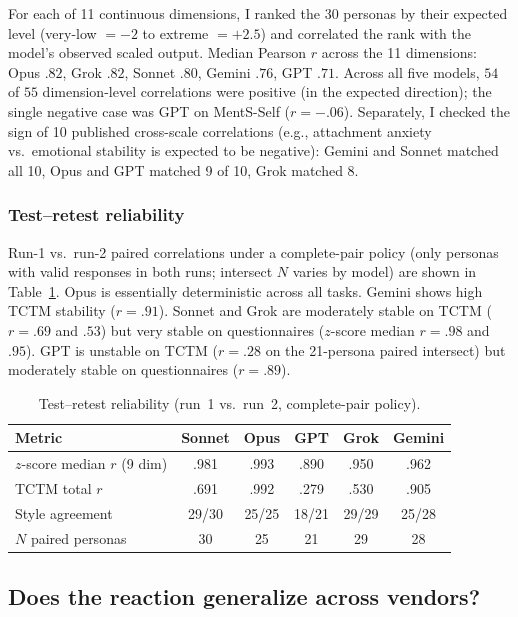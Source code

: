 \documentclass[11pt,a4paper]{article}
\begin{document}
For each of 11 continuous dimensions, I ranked the 30 personas by their expected level (very-low $= -2$ to extreme $= +2.5$) and correlated the rank with the model's observed scaled output. Median Pearson $r$ across the 11 dimensions: Opus $.82$, Grok $.82$, Sonnet $.80$, Gemini $.76$, GPT $.71$. Across all five models, $54$ of $55$ dimension-level correlations were positive (in the expected direction); the single negative case was GPT on MentS-Self ($r = -.06$). Separately, I checked the sign of 10 published cross-scale correlations (e.g., attachment anxiety vs.\ emotional stability is expected to be negative): Gemini and Sonnet matched all 10, Opus and GPT matched 9 of 10, Grok matched 8.

\subsubsection*{Test--retest reliability}

Run-1 vs.\ run-2 paired correlations under a complete-pair policy (only personas with valid responses in both runs; intersect $N$ varies by model) are shown in Table~\ref{tab:retest}. Opus is essentially deterministic across all tasks. Gemini shows high TCTM stability ($r = .91$). Sonnet and Grok are moderately stable on TCTM ($r = .69$ and $.53$) but very stable on questionnaires ($z$-score median $r = .98$ and $.95$). GPT is unstable on TCTM ($r = .28$ on the 21-persona paired intersect) but moderately stable on questionnaires ($r = .89$).

\begin{table}[htbp]\centering\footnotesize
\caption{Test--retest reliability (run~1 vs.\ run~2, complete-pair policy).}
\label{tab:retest}
\begin{tabular}{lccccc}
\toprule
\textbf{Metric} & \textbf{Sonnet} & \textbf{Opus} & \textbf{GPT} & \textbf{Grok} & \textbf{Gemini} \\
\midrule
$z$-score median $r$ (9 dim) & .981 & .993 & .890 & .950 & .962 \\
TCTM total $r$ & .691 & .992 & .279 & .530 & .905 \\
Style agreement & 29/30 & 25/25 & 18/21 & 29/29 & 25/28 \\
$N$ paired personas & 30 & 25 & 21 & 29 & 28 \\
\bottomrule
\end{tabular}
\end{table}

\subsection{Does the reaction generalize across vendors?}\label{sec:crossvendor}
\end{document}
